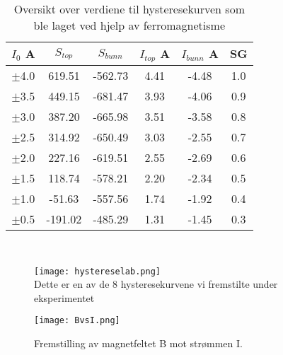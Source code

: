 \documentclass[norsk,a4paper,12pt]{article}
\begin{document}
\begin{table}[!h]
\centering
\caption[Rådata av hysterese kurve]{Oversikt over verdiene til hysteresekurven som ble laget ved hjelp av ferromagnetisme}
	\begin{tabular}{| c | c | c | c | c | c |}
	\hline
	$I_0$ A & $S_{top}$ & $S_{bunn}$ & $I_{top}$ A & $I_{bunn}$ A & SG  \\ 
	\hline
	$\pm$4.0 & 619.51 & -562.73 & 4.41 & -4.48 & 1.0 \\
	$\pm$3.5 & 449.15 & -681.47 & 3.93 & -4.06 & 0.9 \\
	$\pm$3.0 & 387.20 & -665.98 & 3.51 & -3.58 & 0.8 \\
	$\pm$2.5 & 314.92 & -650.49 & 3.03 & -2.55 & 0.7 \\
	$\pm$2.0 & 227.16 & -619.51 & 2.55 & -2.69 & 0.6 \\
	$\pm$1.5 & 118.74 & -578.21 & 2.20 & -2.34 & 0.5 \\
	$\pm$1.0 & -51.63 & -557.56 & 1.74 & -1.92 & 0.4 \\
	$\pm$0.5 & -191.02 & -485.29 & 1.31 & -1.45 & 0.3 \\
	\hline
	\end{tabular}\\
\label{hyst}
\end{table}

 \begin{figure}
 	\begin{minipage}{\linewidth}
		\begin{center}
  		\texttt{[image: hystereselab.png]}\\
		\caption[Hysteresen vi fremstille under lab-dagen]{Dette er en av de 8 hysteresekurvene vi fremstilte under eksperimentet}
		\label{hystlab}
		\end{center}
	\end{minipage}
	\hspace{.5cm}
 	\begin{minipage}{\linewidth}
		\begin{center}
  		\texttt{[image: BvsI.png]}\\
		\caption[Fremstilling av B mot I]{Fremstilling av magnetfeltet B mot strømmen I.}
		\label{BvsI}
		\end{center}
	\end{minipage}
\end{figure}
\end{document}

